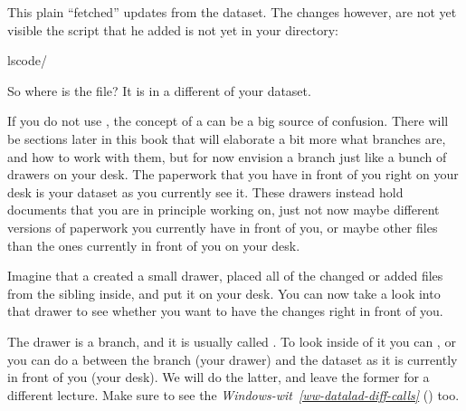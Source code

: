 \sphinxAtStartPar
This plain  “fetched” updates from
the dataset. The changes however, are not yet visible \textendash{} the script that
he added is not yet in your  directory:

\begin{sphinxVerbatim}[commandchars=\\\{\}]
lscode/
\end{sphinxVerbatim}

\sphinxAtStartPar
So where is the file? It is in a different  of your dataset.

\sphinxAtStartPar
If you do not use {\hyperref[\detokenize{glossary:term-Git}]{}}, the concept of a {\hyperref[\detokenize{glossary:term-branch}]{}} can be a big
source of confusion. There will be sections later in this book that will
elaborate a bit more what branches are, and how to work with them, but
for now envision a branch just like a bunch of drawers on your desk.
The paperwork that you have in front of you right on your desk is your
dataset as you currently see it.
These drawers instead hold documents that you are in principle working on,
just not now \textendash{} maybe different versions of paperwork you currently have in
front of you, or maybe other files than the ones currently in front of you
on your desk.

\sphinxAtStartPar
Imagine that a  created a small drawer, placed all of
the changed or added files from the sibling inside, and put it on your
desk. You can now take a look into that drawer to see whether you want
to have the changes right in front of you.

\sphinxAtStartPar
The drawer is a branch, and it is usually called .
To look inside of it you can , or you can
do a  between the branch (your drawer) and the dataset as it
is currently in front of you (your desk). We will do the latter, and leave
the former for a different lecture. Make sure to see the
\textit{Windows-wit}~{\windowswiticoninline}\textit{\ref{ww-datalad-diff-calls}} {\hyperref[\detokenize{basics/101-121-siblings:ww-datalad-diff-calls}]{}} () too.


